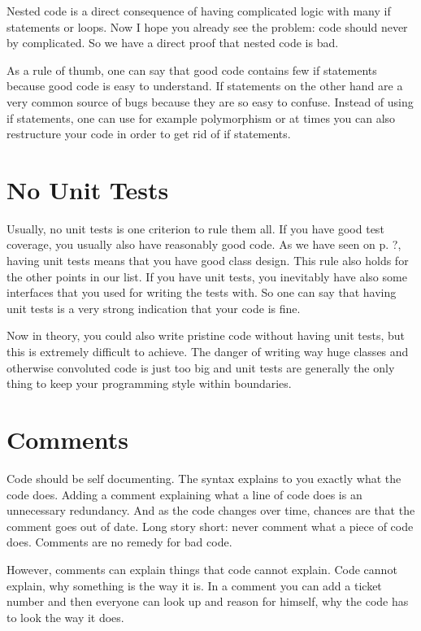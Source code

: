 Nested code is a direct consequence of having complicated logic with many if statements or loops. Now I hope you already see the problem: code should never by complicated. So we have a direct proof that nested code is bad.

As a rule of thumb, one can say that good code contains few if statements because good code is easy to understand. If statements on the other hand are a very common source of bugs because they are so easy to confuse. Instead of using if statements, one can use for example polymorphism or at times you can also restructure your code in order to get rid of if statements.

\section{No Unit Tests}

Usually, no unit tests is one criterion to rule them all. If you have good test coverage, you usually also have reasonably good code. As we have seen on p. ?, having unit tests means that you have good class design. This rule also holds for the other points in our list. If you have unit tests, you inevitably have also some interfaces that you used for writing the tests with. So one can say that having unit tests is a very strong indication that your code is fine.

Now in theory, you could also write pristine code without having unit tests, but this is extremely difficult to achieve. The danger of writing way huge classes and otherwise convoluted code is just too big and unit tests are generally the only thing to keep your programming style within boundaries.

\section{Comments}

Code should be self documenting. The syntax explains to you exactly what the code does. Adding a comment explaining what a line of code does is an unnecessary redundancy. And as the code changes over time, chances are that the comment goes out of date. Long story short: never comment what a piece of code does. Comments are no remedy for bad code.

However, comments can explain things that code cannot explain. Code cannot explain, why something is the way it is. In a comment you can add a ticket number and then everyone can look up and reason for himself, why the code has to look the way it does.

